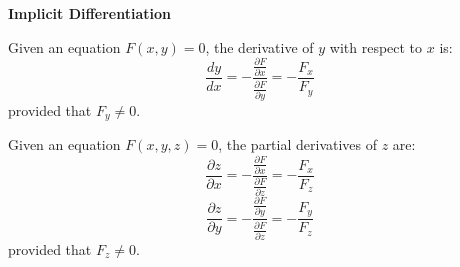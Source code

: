 \documentclass{report}
\begin{document}
\textbf{Implicit Differentiation}
\begin{tcolorbox}[colback=blue!5!white, colframe=blue!75!black, title=Formula for Implicit Differentiation (2D)]
Given an equation $F(x, y) = 0$, the derivative of $y$ with respect to $x$ is:
\[
\frac{dy}{dx} = -\frac{\frac{\partial F}{\partial x}}{\frac{\partial F}{\partial y}} = -\frac{F_x}{F_y}
\]
provided that $F_y \neq 0$.
\end{tcolorbox}

\begin{tcolorbox}[colback=blue!5!white, colframe=blue!75!black, title=Formulas for Implicit Differentiation (3D)]
Given an equation $F(x, y, z) = 0$, the partial derivatives of $z$ are:
\[
\frac{\partial z}{\partial x} = -\frac{\frac{\partial F}{\partial x}}{\frac{\partial F}{\partial z}} = -\frac{F_x}{F_z}
\]
\[
\frac{\partial z}{\partial y} = -\frac{\frac{\partial F}{\partial y}}{\frac{\partial F}{\partial z}} = -\frac{F_y}{F_z}
\]
provided that $F_z \neq 0$.
\end{tcolorbox}
\end{document}
